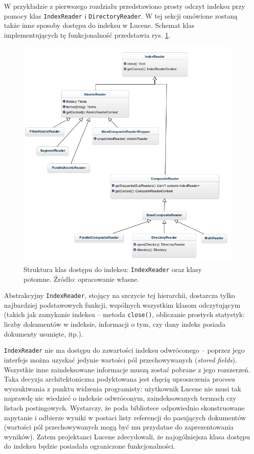 W przykładzie z pierwszego rozdziału przedstawiono prosty odczyt indeksu przy pomocy klas \texttt{IndexReader} i \texttt{DirectoryReader}. W tej sekcji omówione zostaną także inne sposoby dostępu do indeksu w Lucene. Schemat klas implementujących tę funkcjonalność przedstawia rys. \ref{fig:indexReader}. 

\begin{figure}[here]
 \centering
 \includegraphics[scale=0.54]{pictures/Readers_1.jpg}
 \caption{Struktura klas dostępu do indeksu: \texttt{IndexReader} oraz klasy potomne. Źródło: opracowanie własne. \label{fig:indexReader}}
\end{figure}

Abstrakcyjny \texttt{IndexReader}, stojący na szczycie tej hierarchii, dostarcza tylko najbardziej podstawowych funkcji, wspólnych wszystkim klasom odczytującym (takich jak zamykanie indeksu -- metoda \texttt{close()}, obliczanie prostych statystyk: liczby dokumentów w indeksie, informacji o tym, czy dany indeks posiada dokumenty usunięte, itp.). 

\texttt{IndexReader} nie ma dostępu do zawartości indeksu odwróconego -- poprzez jego interfejs można uzyskać jedynie wartości pól przechowywanych (\emph{stored fields}). Wszystkie inne zaindeksowane informacje muszą zostać pobrane z jego rozszerzeń. Taka decyzja architektoniczna podyktowana jest chęcią uproszczenia procesu wyszukiwania z punktu widzenia programisty: użytkownik Lucene nie musi tak naprawdę nic wiedzieć o indeksie odwróconym, zaindeksowanych termach czy listach postingowych. Wystarczy, że poda bibliotece odpowiednio skonstruowane zapytanie i odbierze wyniki w postaci listy referencji do pasujących dokumentów (wartości pól przechowywanych mogą być mu przydatne do zaprezentowania wyników). Zatem projektanci Lucene zdecydowali, że najogólniejsza klasa dostępu do indeksu będzie posiadała ograniczone funkcjonalności.

